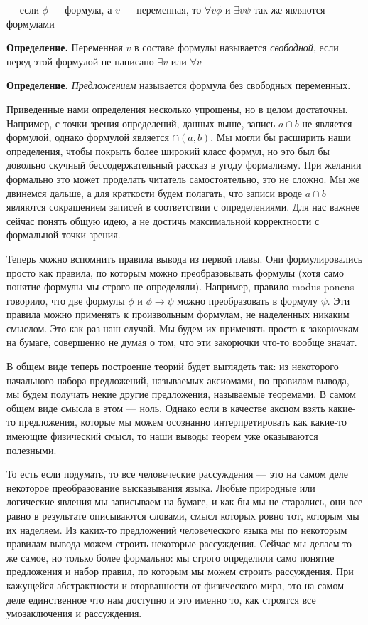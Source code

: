 — если $\phi$ — формула, а $v$ — переменная, то $\forall v \phi$ и $\exists v \psi$ так же являются формулами

{\bfseries Определение.} Переменная $v$ в составе формулы называется {\slshape свободной}, если перед этой формулой не написано $\exists v$ или $\forall v$

{\bfseries Определение.} {\slshape Предложением} называется формула без свободных переменных.

Приведенные нами определения несколько упрощены, но в целом достаточны. Например, с точки зрения определений, данных выше, запись $a\cap b$ не является формулой, однако формулой является $\cap(a, b)$. Мы могли бы расширить наши определения, чтобы покрыть более широкий класс формул, но это был бы довольно скучный бессодержательный рассказ в угоду формализму. При желании формально это может проделать читатель самостоятельно, это не сложно. Мы же двинемся дальше, а для краткости будем полагать, что записи вроде $a\cap b$ являются сокращением записей в соответствии с определениями. Для нас важнее сейчас понять общую идею, а не достичь максимальной корректности с формальной точки зрения.

Теперь можно вспомнить правила вывода из первой главы. Они формулировались просто как правила, по которым можно преобразовывать формулы (хотя само понятие формулы мы строго не определяли). Например, правило modus ponens говорило, что две формулы $\phi$ и $\phi\rightarrow\psi$ можно преобразовать в формулу $\psi$. Эти правила можно применять к произвольным формулам, не наделенных никаким смыслом. Это как раз наш случай. Мы будем их применять просто к закорючкам на бумаге, совершенно не думая о том, что эти закорючки что-то вообще значат.

В общем виде теперь построение теорий будет выглядеть так: из некоторого начального набора предложений, называемых аксиомами, по правилам вывода, мы будем получать некие другие предложения, называемые теоремами. В самом общем виде смысла в этом — ноль. Однако если в качестве аксиом взять какие-то предложения, которые мы можем осознанно интерпретировать как какие-то имеющие физический смысл, то наши выводы теорем уже оказываются полезными.

То есть если подумать, то все человеческие рассуждения — это на самом деле некоторое преобразование высказывания языка. Любые природные или логические явления мы записываем на бумаге, и как бы мы не старались, они все равно в результате описываются словами, смысл которых ровно тот, которым мы их наделяем. Из каких-то предложений человеческого языка мы по некоторым правилам вывода можем строить некоторые рассуждения. Сейчас мы делаем то же самое, но только более формально: мы строго определили само понятие предложения и набор правил, по которым мы можем строить рассуждения. При кажущейся абстрактности и оторванности от физического мира, это на самом деле единственное что нам доступно и это именно то, как строятся все умозаключения и рассуждения.

